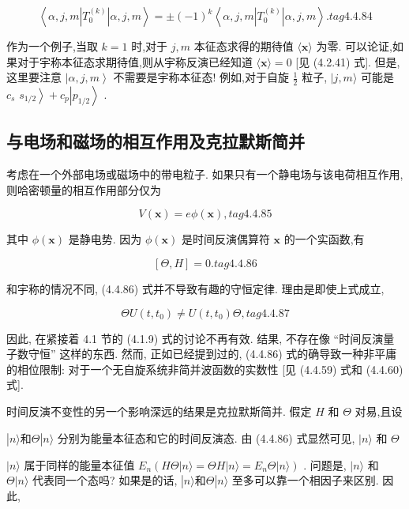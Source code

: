 $$
\left\langle {\alpha, j, m\left| {T}_{0}^{\left( k\right) }\right| \alpha, j, m}\right\rangle = \pm {\left( -1\right) }^{k}\left\langle {\alpha, j, m\left| {T}_{0}^{\left( k\right) }\right| \alpha, j, m}\right\rangle . tag{4. 4.84}
$$

作为一个例子,当取 $k = 1$ 时,对于 $j, m$ 本征态求得的期待值 $\langle \mathbf{x}\rangle$ 为零. 可以论证,如果对于宇称本征态求期待值,则从宇称反演已经知道 $\langle \mathbf{x}\rangle = 0$ [见 (4.2.41) 式]. 但是, 这里要注意 $\left| {\alpha, j, m}\right\rangle$ 不需要是宇称本征态! 例如,对于自旋 $\frac{1}{2}$ 粒子, $|j, m\rangle$ 可能是 ${c}_{s}$ $\left. {s}_{1/2}\right\rangle + {c}_{p}\left| {p}_{1/2}\right\rangle$ .

\subsection{与电场和磁场的相互作用及克拉默斯简并}

考虑在一个外部电场或磁场中的带电粒子. 如果只有一个静电场与该电荷相互作用, 则哈密顿量的相互作用部分仅为

$$
V\left( \mathbf{x}\right) = {e\phi }\left( \mathbf{x}\right) , tag{4. 4.85}
$$

其中 $\phi \left( \mathbf{x}\right)$ 是静电势. 因为 $\phi \left( \mathbf{x}\right)$ 是时间反演偶算符 $\mathbf{x}$ 的一个实函数,有

$$
\left\lbrack {\Theta, H}\right\rbrack = 0. tag{4. 4.86}
$$

和宇称的情况不同, (4.4.86) 式并不导致有趣的守恒定律. 理由是即使上式成立,

$$
{\Theta U}\left( {t,{t}_{0}}\right) \neq U\left( {t,{t}_{0}}\right) \Theta , tag{4. 4.87}
$$

因此, 在紧接着 4.1 节的 (4.1.9) 式的讨论不再有效. 结果, 不存在像 “时间反演量子数守恒” 这样的东西. 然而, 正如已经提到过的, (4.4.86) 式的确导致一种非平庸的相位限制: 对于一个无自旋系统非简并波函数的实数性 [见 (4.4.59) 式和 (4.4.60) 式].

时间反演不变性的另一个影响深远的结果是克拉默斯简并. 假定 $H$ 和 $\Theta$ 对易,且设

$\left| {n\rangle \text{和}\Theta }\right| n\rangle$ 分别为能量本征态和它的时间反演态. 由 (4.4.86) 式显然可见, $|n\rangle$ 和 $\Theta$

$|n\rangle$ 属于同样的能量本征值 ${E}_{n}\left( {{H\Theta }\left| {n\rangle = {\Theta H}}\right| n\rangle = {E}_{n}\Theta |n\rangle }\right)$ . 问题是, $|n\rangle$ 和 $\Theta |n\rangle$ 代表同一个态吗? 如果是的话, $\left| {n\rangle \text{和}\Theta }\right| n\rangle$ 至多可以靠一个相因子来区别. 因此,

